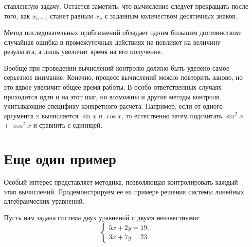 \twocolumn
\par \noindent ставленную задачу. Остается заметить, что вычисление следует прекращать после того, как $x_{n+1}$ станет равным $x_{n}$ с заданным количеством десятичных знаков.

\par Метод последовательных приближений обладает одним большим достоинством: случайная ошибка в промежуточных действиях не повлияет на величину результата, а лишь увеличит время на его получение.

\par Вообще при проведении вычислений контролю должно быть уделено самое серьезное внимание. Конечно, процесс вычислений можно повторить заново, но это вдвое увеличит общее время работы. В особо ответственных случаях приходится идти и на этот шаг, но возможны и другие методы контроля, учитывающие специфику конкретного расчета. Например, если от одного аргумента x вычисляется $\sin x$ и $\cos x$, то естественно затем подсчитать $\sin^{2}x$ + $\cos^{2}x$ и сравнить с единицей.

\section*{Еще один пример}
\par \noindent Особый интерес представляет методика, позволяющая контролировать каждый этап вычислений. Продемонстрируем ее на примере решения системы линейных алгебраических уравнений.

\par Пусть нам задана система двух уравнений с двумя неизвестными:
\begin{equation} \tag{4}
 \begin{cases}
   5x + 2y= 19,\\
   3x + 7y = 23.
 \end{cases}
\end{equation}
